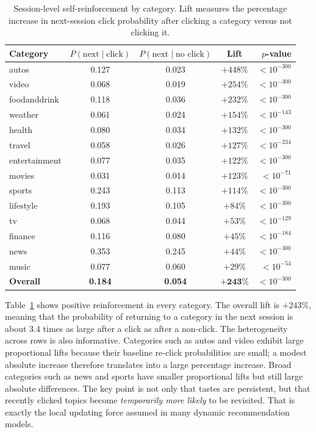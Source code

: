 \documentclass[11pt]{article}
\begin{document}
\begin{table}[ht]
\centering
\caption{Session-level self-reinforcement by category. Lift measures the percentage increase in next-session click probability after clicking a category versus not clicking it.}
\label{tab:selfreinforcement}
\small
\begin{tabular}{lcccr}
\toprule
Category & $P(\text{next} \mid \text{click})$ & $P(\text{next} \mid \text{no click})$ & Lift & $p$-value \\
\midrule
autos & 0.127 & 0.023 & $+448\%$ & $< 10^{-300}$ \\
video & 0.068 & 0.019 & $+254\%$ & $< 10^{-300}$ \\
foodanddrink & 0.118 & 0.036 & $+232\%$ & $< 10^{-300}$ \\
weather & 0.061 & 0.024 & $+154\%$ & $< 10^{-143}$ \\
health & 0.080 & 0.034 & $+132\%$ & $< 10^{-300}$ \\
travel & 0.058 & 0.026 & $+127\%$ & $< 10^{-234}$ \\
entertainment & 0.077 & 0.035 & $+122\%$ & $< 10^{-300}$ \\
movies & 0.031 & 0.014 & $+123\%$ & $< 10^{-71}$ \\
sports & 0.243 & 0.113 & $+114\%$ & $< 10^{-300}$ \\
lifestyle & 0.193 & 0.105 & $+84\%$ & $< 10^{-300}$ \\
tv & 0.068 & 0.044 & $+53\%$ & $< 10^{-129}$ \\
finance & 0.116 & 0.080 & $+45\%$ & $< 10^{-184}$ \\
news & 0.353 & 0.245 & $+44\%$ & $< 10^{-300}$ \\
music & 0.077 & 0.060 & $+29\%$ & $< 10^{-54}$ \\
\midrule
\textbf{Overall} & \textbf{0.184} & \textbf{0.054} & $\boldsymbol{+243\%}$ & $< 10^{-300}$ \\
\bottomrule
\end{tabular}
\end{table}
\FloatBarrier

Table~\ref{tab:selfreinforcement} shows positive reinforcement in every category. The overall lift is $+243\%$, meaning that the probability of returning to a category in the next session is about 3.4 times as large after a click as after a non-click. The heterogeneity across rows is also informative. Categories such as autos and video exhibit large proportional lifts because their baseline re-click probabilities are small; a modest absolute increase therefore translates into a large percentage increase. Broad categories such as news and sports have smaller proportional lifts but still large absolute differences. The key point is not only that tastes are persistent, but that recently clicked topics become \emph{temporarily more likely} to be revisited. That is exactly the local updating force assumed in many dynamic recommendation models.
\end{document}
